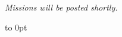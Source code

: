 \documentclass{40k}
\begin{document}
\clearpage

\noindent\begin{minipage}[t][\textheight-6pt][t]{1.0\linewidth}
\vfill  
\centerline{\Huge\emph{Missions will be posted shortly.}}
\vfill
\vbox to 0pt{}
\end{minipage}

%
\end{document}
